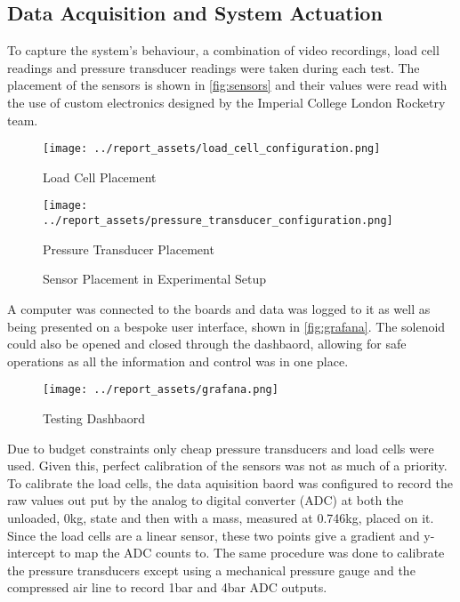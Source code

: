 \subsection{Data Acquisition and System Actuation}
To capture the system's behaviour, a combination of video recordings, load cell readings and pressure transducer readings were taken during each test. The placement of the sensors is shown in \autoref{fig:sensors} and their values were read with the use of custom electronics designed by the Imperial College London Rocketry team.
\begin{figure}[htbp]
    \centering

    \begin{minipage}{0.45\textwidth}
        \centering
        \texttt{[image: ../report\_assets/load\_cell\_configuration.png]}
        \caption*{Load Cell Placement}
    \end{minipage}
    \hfill
    \begin{minipage}{0.45\textwidth}
        \centering
        \texttt{[image: ../report\_assets/pressure\_transducer\_configuration.png]}
        \caption*{Pressure Transducer Placement}
    \end{minipage}
    \caption{Sensor Placement in Experimental Setup}\label{fig:sensors}
\end{figure}

A computer was connected to the boards and data was logged to it as well as being presented on a bespoke user interface, shown in \autoref{fig:grafana}. The solenoid could also be opened and closed through the dashbaord, allowing for safe operations as all the information and control was in one place.
\begin{figure}[htbp]
    \centering

    \begin{minipage}{0.95\textwidth}
        \centering
        \texttt{[image: ../report\_assets/grafana.png]}
        \caption{Testing Dashbaord}\label{fig:grafana}
    \end{minipage}

\end{figure}
Due to budget constraints only cheap pressure transducers and load cells were used. Given this, perfect calibration of the sensors was not as much of a priority. To calibrate the load cells, the data aquisition baord was configured to record the raw values out put by the analog to digital converter (ADC) at both the unloaded, 0kg, state and then with a mass, measured at 0.746kg, placed on it. Since the load cells are a linear sensor, these two points give a gradient and y-intercept to map the ADC counts to. The same procedure was done to calibrate the pressure transducers except using a mechanical pressure gauge and the compressed air line to record 1bar and 4bar ADC outputs.

